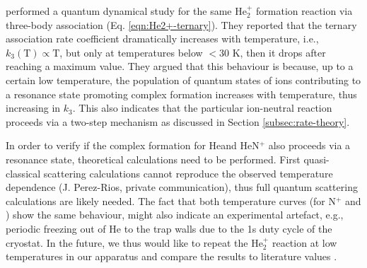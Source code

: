 \citet{xie_quantum_2003} performed a quantum dynamical study for the same He$_2^+$ formation reaction via three-body association (Eq. \ref{eqn:He2+-ternary}). They reported that the ternary association rate coefficient dramatically increases with temperature, i.e., $k_3(\text{T}) \propto \text{T}$, but only at temperatures below $< 30$ K, then it drops after reaching a maximum value. They argued that this behaviour is because, up to a certain low temperature, the population of quantum states of ions contributing to a resonance state promoting complex formation increases with temperature, thus increasing in $k_3$. This also indicates that the particular ion-neutral reaction proceeds via a two-step mechanism as discussed in Section \ref{subsec:rate-theory}.

In order to verify if the complex formation for He\CD and HeN$^+$ also proceeds
via a resonance state, theoretical calculations need to be performed. First
quasi-classical scattering calculations cannot reproduce the observed
temperature dependence (J. Perez-Rios, private communication), thus full quantum
scattering calculations are likely needed. The fact that both temperature
curves (for N$^+$ and \CD) show the same behaviour, might also indicate an
experimental artefact, e.g., periodic freezing out of He to the trap walls due
to the 1s duty cycle of the cryostat. In the future, we thus would like to repeat
the He$_2^+$ reaction at low temperatures in our apparatus and compare the
results to literature values \cite{bohringer_temperature_1983, plasil_stabilization_2012, gerlich_infrared_2018}.

